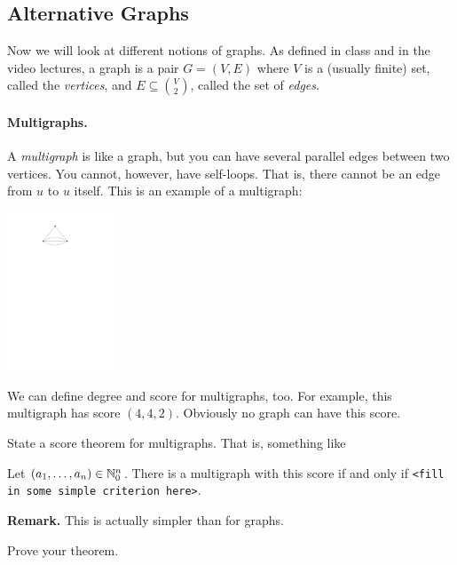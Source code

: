 \documentclass[12pt,a4]{article}
\begin{document}
\subsection{Alternative Graphs}

Now we will look at different notions of graphs. As defined in class and in the video
lectures, a graph is a pair $G = (V,E)$ where $V$ is a (usually finite) set, called the {\em vertices},
and $E \subseteq {V \choose 2}$, called the set of {\em edges}.

\paragraph{Multigraphs.}
A {\em multigraph} is like a graph, but you can have several parallel edges between
two vertices. You cannot, however, have self-loops. That is, there cannot
be an edge from $u$ to $u$ itself. This is an example of a multigraph:

\begin{center}
  \includegraphics[width=0.25\textwidth]{figures/multigraph-score.pdf}
\end{center}

We can define degree and score for multigraphs, too. For example, this multigraph
has score $(4,4,2)$. Obviously no graph
can have this score.



\begin{exercise}
  State a score theorem for multigraphs. That is, something like
  \begin{theorem}
     Let $(a_1,\dots,a_n) \in \mathbb{N}_0^n$. There is a multigraph
     with this score if and only if \texttt{\textup{<fill in some simple criterion here>}}.
  \end{theorem}


  \textbf{Remark.} This is actually
  simpler than for graphs.
\end{exercise}

\begin{exercise}
  Prove your theorem.
\end{exercise}
\end{document}
